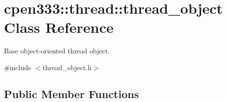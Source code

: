\hypertarget{classcpen333_1_1thread_1_1thread__object}{}\section{cpen333\+:\+:thread\+:\+:thread\+\_\+object Class Reference}
\label{classcpen333_1_1thread_1_1thread__object}


Base object-\/oriented thread object.  




{\ttfamily \#include $<$thread\+\_\+object.\+h$>$}

\subsection*{Public Member Functions}
